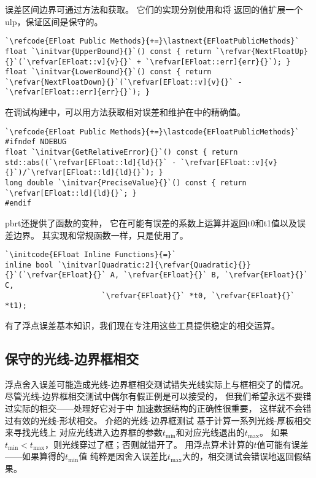 误差区间边界可通过方法和获取。
它们的实现分别使用和将
返回的值扩展一个ulp，保证区间是保守的。
\begin{lstlisting}
`\refcode{EFloat Public Methods}{+=}\lastnext{EFloatPublicMethods}`
float `\initvar{UpperBound}{}`() const { return `\refvar{NextFloatUp}{}`(`\refvar[EFloat::v]{v}{}` + `\refvar[EFloat::err]{err}{}`); }
float `\initvar{LowerBound}{}`() const { return `\refvar{NextFloatDown}{}`(`\refvar[EFloat::v]{v}{}` - `\refvar[EFloat::err]{err}{}`); }
\end{lstlisting}

在调试构建中，可以用方法获取相对误差和维护在中的精确值。
\begin{lstlisting}
`\refcode{EFloat Public Methods}{+=}\lastcode{EFloatPublicMethods}`
#ifndef NDEBUG
float `\initvar{GetRelativeError}{}`() const { return std::abs((`\refvar[EFloat::ld]{ld}{}` - `\refvar[EFloat::v]{v}{}`)/`\refvar[EFloat::ld]{ld}{}`); }
long double `\initvar{PreciseValue}{}`() const { return `\refvar[EFloat::ld]{ld}{}`; }
#endif
\end{lstlisting}

pbrt还提供了函数的变种，
它在可能有误差的系数上运算并返回{\ttfamily t0}和{\ttfamily t1}值以及误差边界。
其实现和常规函数一样，只是使用了。
\begin{lstlisting}
`\initcode{EFloat Inline Functions}{=}`
inline bool `\initvar[Quadratic:2]{\refvar{Quadratic}{}}{}`(`\refvar{EFloat}{}` A, `\refvar{EFloat}{}` B, `\refvar{EFloat}{}` C,
                      `\refvar{EFloat}{}` *t0, `\refvar{EFloat}{}` *t1);
\end{lstlisting}

有了浮点误差基本知识，我们现在专注用这些工具提供稳定的相交运算。

\subsection{保守的光线-边界框相交}
浮点舍入误差可能造成光线-边界框相交测试错失光线实际上与框相交了的情况。
尽管光线-边界框相交测试中偶尔有假正例是可以接受的，
但我们希望永远不要错过实际的相交——处理好它对于中
加速数据结构的正确性很重要，
这样就不会错过有效的光线-形状相交。
介绍的光线-边界框测试
基于计算一系列光线-厚板相交来寻找光线上
对应光线进入边界框的参数$t_{\min}$和对应光线退出的$t_{\max}$。
如果$t_{\min}<t_{\max}$，则光线穿过了框；否则就错开了。
用浮点算术计算的$t$值可能有误差——如果算得的$t_{\min}$值
纯粹是因舍入误差比$t_{\max}$大的，相交测试会错误地返回假结果。

